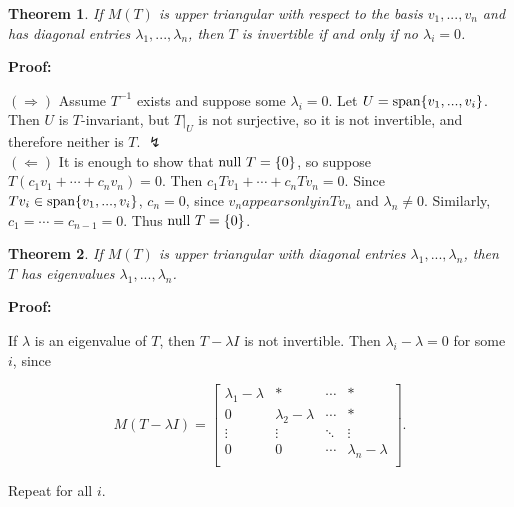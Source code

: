 \documentclass{article}
\theoremstyle{colontheorem}
\newtheorem{theorem}{Theorem}[section]
\newcommand{\Span}{\textnormal{span}}
\newcommand{\Null}{\textnormal{null }}
\newenvironment{Theorem}
{
	\begin{mdframed}[backgroundcolor=TheoremOrange!10]
	\begin{theorem}
}
{
	\end{theorem}
	\end{mdframed}
	
	\vspace{.15in}
}
\newenvironment{Proof}
{
	\vspace{-.3in}
	
	\begin{mdframed}[backgroundcolor=ProofPurple!10]
	\textbf{Proof:}%
}
{
	\end{mdframed}
	
	\vspace{.15in}
}
\begin{document}
\begin{Theorem}
	
	If $M(T)$ is upper triangular with respect to the basis $v_1, ..., v_n$ and has diagonal entries $\lambda_1, ..., \lambda_n$, then $T$ is invertible if and only if no $\lambda_i = 0$.
	
\end{Theorem}



\begin{Proof}
	$(\Rightarrow)$ Assume $T^{-1}$ exists and suppose some $\lambda_i = 0$. Let $U = \Span \{v_1, ..., v_i\}$. Then $U$ is $T$-invariant, but $T|_U$ is not surjective, so it is not invertible, and therefore neither is $T$. $\lightning$\\
	
	$(\Leftarrow)$ It is enough to show that $\Null T = \{0\}$, so suppose $T(c_1 v_1 + \cdots + c_n v_n) = 0$. Then $c_1 Tv_1 + \cdots + c_n Tv_n = 0$. Since $Tv_i \in \Span \{v_1, ..., v_i\}$, $c_n = 0$, since $v_n appears only in Tv_n$ and $\lambda_n \neq 0$. Similarly, $c_1 = \cdots = c_{n-1} = 0$. Thus $\Null T = \{0\}$.
	
\end{Proof}



\begin{Theorem}
	
	If $M(T)$ is upper triangular with diagonal entries $\lambda_1, ..., \lambda_n$, then $T$ has eigenvalues $\lambda_1, ..., \lambda_n$.
	
\end{Theorem}



\begin{Proof}
	If $\lambda$ is an eigenvalue of $T$, then $T - \lambda I$ is not invertible. Then $\lambda_i - \lambda = 0$ for some $i$, since
	
	$$
		M(T - \lambda I) = \begin{bmatrix}
			\lambda_1 - \lambda & * & \cdots & *\\
			0 & \lambda_2 - \lambda & \cdots & *\\
			\vdots & \vdots & \ddots & \vdots\\
			0 & 0 & \cdots & \lambda_n - \lambda\\
		\end{bmatrix}.
	$$
	
	Repeat for all $i$.
	
\end{Proof}
\end{document}

